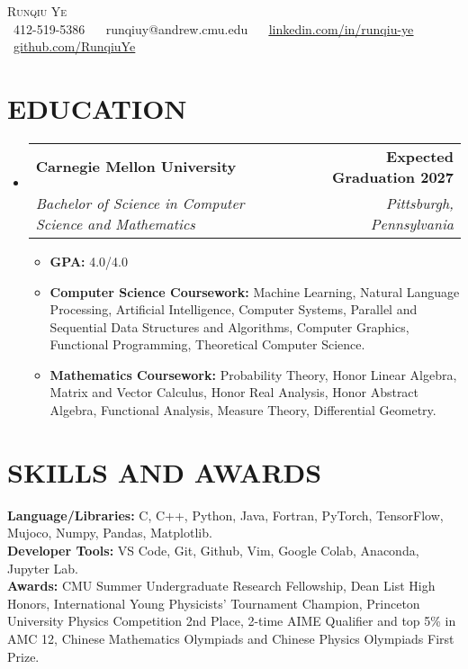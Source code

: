 \documentclass[letterpaper,11pt]{article}
\makeatletter
\newcommand{\resumeItem}[1]{
  \item\small{
    {#1 \vspace{-2pt}}
  }
}
\newcommand{\resumeSubheading}[4]{
  \vspace{-2pt}\item
    \begin{tabular*}{1.0\textwidth}[t]{l@{\extracolsep{\fill}}r}
      {#1} & \textbf{\small #2} \\
      \textit{\small#3} & \textit{\small #4} \\
    \end{tabular*}\vspace{-7pt}
}
\newcommand{\resumeSubHeadingListStart}{\begin{itemize}[leftmargin=0.0in, label={}]}
\newcommand{\resumeSubHeadingListEnd}{\end{itemize}}
\newcommand{\resumeItemListStart}{\begin{itemize}[leftmargin=0.15in]}
\newcommand{\resumeItemListEnd}{\end{itemize}\vspace{-5pt}}
\makeatother
\begin{document}

\begin{center}
    {\Huge \scshape Runqiu Ye} \\ \vspace{5pt}
    \small \raisebox{-0.1\height}\faPhone\ 412-519-5386 ~ 
    {\raisebox{-0.1\height}\faEnvelope\ 
    {runqiuy@andrew.cmu.edu}} ~ 
    {\raisebox{-0.1\height}\faLinkedin\ 
    \href{https://www.linkedin.com/in/runqiu-ye/}
    {\underline{linkedin.com/in/runqiu-ye}}}  ~
    {\raisebox{-0.1\height}\faGithub\ 
    \href{https://github.com/RunqiuYe}
    {\underline{github.com/RunqiuYe}}}
\end{center}
\vspace{-5pt}


\section{EDUCATION}
\resumeSubHeadingListStart
\resumeSubheading
  {\textbf{Carnegie Mellon University}}{Expected Graduation 2027}
  {Bachelor of Science in Computer Science and Mathematics}
  {Pittsburgh, Pennsylvania}
\resumeItemListStart
\resumeItem{\textbf{GPA:} 4.0/4.0}
\resumeItem{\textbf{Computer Science Coursework:} Machine Learning, 
Natural Language Processing, Artificial Intelligence, 
Computer Systems, Parallel and Sequential Data 
Structures and Algorithms, Computer Graphics,
Functional Programming, Theoretical Computer Science.}
\resumeItem{\textbf{Mathematics Coursework:} 
Probability Theory, Honor Linear Algebra, 
Matrix and Vector Calculus, Honor Real Analysis, 
Honor Abstract Algebra, Functional 
Analysis, Measure Theory, Differential Geometry.}
\resumeItemListEnd
\resumeSubHeadingListEnd

\vspace{-10pt}

\section{SKILLS AND AWARDS}
\begin{itemize}[leftmargin=0in, label={}]
  \small{\item{
   \textbf{Language/Libraries:} C, C++, Python, Java, Fortran, 
   PyTorch, TensorFlow, Mujoco, Numpy, Pandas, Matplotlib. \\
   \textbf{Developer Tools:} VS Code, Git, Github, Vim, 
   Google Colab, Anaconda, Jupyter Lab. \\
   \textbf{Awards:} CMU Summer Undergraduate Research 
   Fellowship, Dean List High Honors, International 
   Young Physicists' Tournament Champion, Princeton 
   University Physics Competition 2nd Place, 
   2-time AIME Qualifier and top 5\% in AMC 12, 
   Chinese Mathematics Olympiads and Chinese Physics 
   Olympiads First Prize. \\
  }}
\end{itemize}
\vspace{-16pt}
\end{document}
